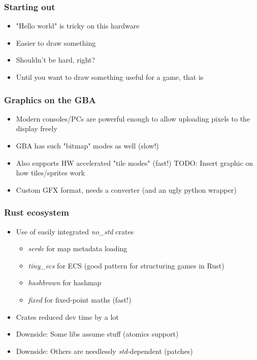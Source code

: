 \documentclass{beamer}
\begin{document}
\begin{frame}
\frametitle{Starting out}
\begin{itemize}
	\item "Hello world" is tricky on this hardware
	\item Easier to draw something
	\item Shouldn't be hard, right?
	\item Until you want to draw something useful for a game, that is
\end{itemize}
\end{frame}

\begin{frame}
\frametitle{Graphics on the GBA}
\begin{itemize}
	\item Modern consoles/PCs are powerful enough to allow uploading pixels to the display freely
	\item GBA has such "bitmap" modes as well (slow!)
	\item Also supports HW accelerated "tile modes" (fast!)
	TODO: Insert graphic on how tiles/sprites work
	\item Custom GFX format, needs a converter (and an ugly python wrapper)
	
\end{itemize}
\end{frame}


\begin{frame}
\frametitle{Rust ecosystem}
\begin{itemize}
	\item Use of easily integrated \emph{no\_std} crates
    \begin{itemize}
    	\item \emph{serde} for map metadata loading
    	\item \emph{tiny\_ecs} for ECS (good pattern for structuring games in Rust)
    	\item \emph{hashbrown} for hashmap
    	\item \emph{fixed} for fixed-point maths (fast!)
    \end{itemize}
	\item Crates reduced dev time by a lot
	\item Downside: Some libs assume stuff (atomics support)
	\item Downside: Others are needlessly \emph{std}-dependent (patches)
\end{itemize}
\end{frame}
\end{document}
